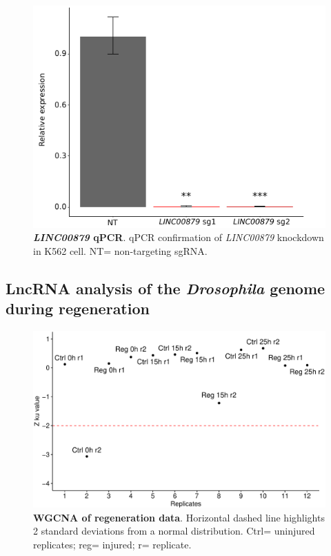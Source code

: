 \begin{figure}[ht!]
  \centering
  \includegraphics[scale=0.9]{plots/appendix/ml/qPCR.josh.results.pdf}
  \caption[\textit{LINC00879} qPCR]{\textbf{\textit{LINC00879} qPCR}. qPCR confirmation of \textit{LINC00879} knockdown in K562 cell. NT= non-targeting sgRNA.}
  \label{supp-fig:qpcr-kd-linc}
\end{figure}

\clearpage

\subsection{LncRNA analysis of the \textit{Drosophila} genome during regeneration}
\label{sec:sup_fig_part_1}

\begin{figure}[ht!]
  \centering
  \includegraphics[scale=0.6]{plots/appendix/dme/connectivity.reg.pdf}
  \caption[WGCNA of regeneration data]{\textbf{WGCNA of regeneration data}. Horizontal dashed line highlights 2 standard deviations from a normal distribution. Ctrl= uninjured replicates; reg= injured; r= replicate.}
  \label{supp-fig:connectivity-reg}
\end{figure}


